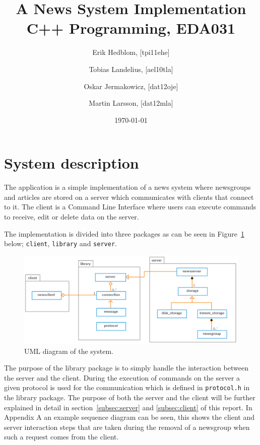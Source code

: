 \documentclass[a4paper]{article}
\title{A News System Implementation \\ C++ Programming, EDA031}
\author{Erik Hedblom, [tpi11ehe]
\and Tobias Landelius, [ael10tla]
\and Oskar Jermakowicz, [dat12oje]
\and Martin Larsson, [dat12mla]}
\date{\today}
\begin{document}
\maketitle

\newpage
\renewcommand{\contentsname}{Table of contents}
\tableofcontents
\newpage

\section{System description}
The application is a simple implementation of a news system where newsgroups and articles are stored on a server which communicates with clients that connect to it. The client is a Command Line Interface where users can execute commands to receive, edit or delete data on the server.

The implementation is divided into three packages as can be seen in Figure~\ref{fig:uml} below; \texttt{client}, \texttt{library} and \texttt{server}.

\begin{figure}[h]
    \centering
    \includegraphics[width=1.0\textwidth]{uml_diagram.png}
    \caption{UML diagram of the system.}
    \label{fig:uml}
\end{figure}

The purpose of the library package is to simply handle the interaction between the server and the client. During the execution of commands on the server a given protocol is used for the communication which is defined in \texttt{protocol.h} in the library package. The purpose of both the server and the client will be further explained in detail in section~\ref{subsec:server} and \ref{subsec:client} of this report. In Appendix A an example sequence diagram can be seen, this shows the client and server interaction steps that are taken during the removal of a newsgroup when such a request comes from the client.
\end{document}
